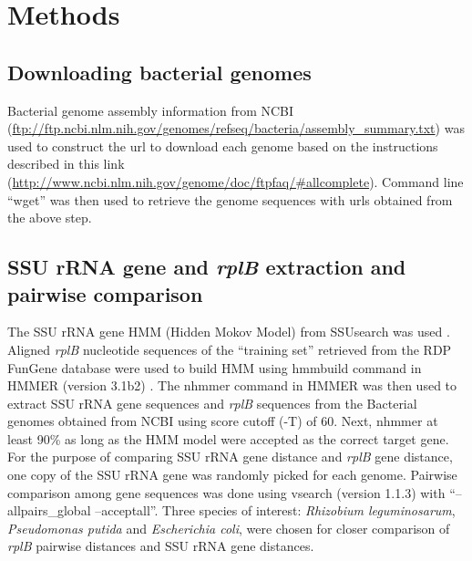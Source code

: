 \documentclass[]{msu-thesis}
\begin{document}
\section{Methods}

\subsection{Downloading bacterial genomes}
Bacterial genome assembly information from NCBI (\url{ftp://ftp.ncbi.nlm.nih.gov/genomes/refseq/bacteria/assembly_summary.txt}) was used to construct the url to download each genome based on the instructions described in this link (\url{http://www.ncbi.nlm.nih.gov/genome/doc/ftpfaq/#allcomplete}). Command line ``wget'' was then used to retrieve the genome sequences with urls obtained from the above step. 

\subsection{SSU rRNA gene and \textit{rplB} extraction and pairwise comparison}
The SSU rRNA gene HMM (Hidden Mokov Model) from SSUsearch was used \cite{guo_microbial_2015}. Aligned \textit{rplB} nucleotide sequences of the ``training set'' retrieved from the RDP FunGene database were used to build HMM using hmmbuild command in HMMER (version 3.1b2) \cite{eddy_new_2009,fish_fungene:_2013}. The nhmmer command in HMMER was then used to extract SSU rRNA gene sequences and \textit{rplB} sequences from the Bacterial genomes obtained from NCBI using score cutoff (-T) of 60. Next, nhmmer at least 90\% as long as the HMM model were accepted as the correct target gene. For the purpose of comparing SSU rRNA gene distance and \textit{rplB} gene distance, one copy of the SSU rRNA gene was randomly picked for each genome. Pairwise comparison among gene sequences was done using vsearch (version 1.1.3) \cite{rognes_vsearch:_2016} with ``--allpairs\_global --acceptall''. Three species of interest: \textit{Rhizobium leguminosarum}, \textit{Pseudomonas putida} and \textit{Escherichia coli}, were chosen for closer comparison of \textit{rplB} pairwise distances and SSU rRNA gene distances.


\end{document}
